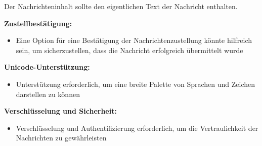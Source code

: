 \noindent Der Nachrichteninhalt sollte den eigentlichen Text der Nachricht enthalten.


\noindent \textbf{Zustellbestätigung:}
\begin{itemize}
    \item Eine Option für eine Bestätigung der Nachrichtenzustellung könnte 
    hilfreich sein, um sicherzustellen, dass die Nachricht erfolgreich 
    übermittelt wurde
\end{itemize}


\noindent \textbf{Unicode-Unterstützung:}
\begin{itemize}
    \item Unterstützung erforderlich, um eine breite Palette von Sprachen und
    Zeichen darstellen zu können
\end{itemize}

\noindent \textbf{Verschlüsselung und Sicherheit:}
\begin{itemize}
    \item Verschlüsselung und Authentifizierung erforderlich, um die Vertraulichkeit der Nachrichten zu gewährleisten
\end{itemize}